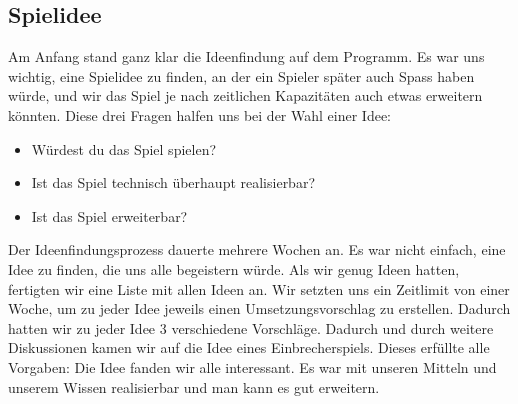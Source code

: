 \documentclass[11pt,a4paper]{scrbook}
\begin{document}
\subsection{Spielidee}
Am Anfang stand ganz klar die Ideenfindung auf dem Programm. Es war uns wichtig,
eine Spielidee zu finden, an der ein Spieler später auch Spass haben würde,
und wir das Spiel je nach zeitlichen Kapazitäten auch etwas erweitern könnten.
Diese drei Fragen halfen uns bei der Wahl einer Idee:
\begin{itemize}
\item Würdest du das Spiel spielen?
\item Ist das Spiel technisch überhaupt realisierbar?
\item Ist das Spiel erweiterbar?
\end{itemize}
Der Ideenfindungsprozess dauerte mehrere Wochen an. Es war nicht einfach, eine Idee
zu finden, die uns alle begeistern würde. 
Als wir genug Ideen hatten, fertigten wir eine Liste mit allen Ideen an. 
Wir setzten uns ein Zeitlimit von einer Woche, um zu jeder Idee jeweils einen Umsetzungsvorschlag zu erstellen. 
Dadurch hatten wir zu jeder Idee 3 verschiedene Vorschläge.
Dadurch und durch weitere Diskussionen kamen wir auf die Idee eines Einbrecherspiels.
Dieses erfüllte alle Vorgaben:
Die Idee fanden wir alle interessant. Es war mit unseren Mitteln und unserem Wissen realisierbar und man kann es gut erweitern.
\end{document}
